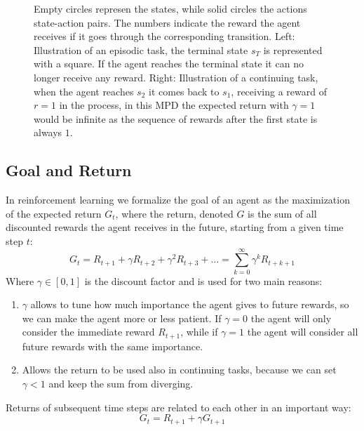 \begin{figure}
    \centering
    
    \caption{Empty circles represen the states, while solid circles the actions state-action pairs. The numbers indicate the reward the agent receives if it goes through the corresponding transition. Left: Illustration of an episodic task, the terminal state $s_T$ is represented with a square. If the agent reaches the terminal state it can no longer receive any reward. Right: Illustration of a continuing task, when the agent reaches $s_2$ it comes back to $s_1$, receiving a reward of $r=1$ in the process, in this MPD the expected return with $\gamma = 1$ would be infinite as the sequence of rewards after the first state is always $1$.}
    \label{fig:episodic-continuing}
\end{figure}

\subsection{Goal and Return}
In reinforcement learning we formalize the goal of an agent as the maximization of the expected return $G_t$, where the return, denoted $G$ is the sum of all discounted rewards the agent receives in the future, starting from a given time step $t$:
\begin{equation}
    G_t = R_{t+1} + \gamma R_{t+2} + \gamma^2 R_{t+3} + \dots = \sum_{k=0}^{\infty} \gamma^k R_{t+k+1}
    \label{return}
\end{equation}
Where $\gamma \in [0, 1]$ is the discount factor and is used for two main reasons:
\begin{enumerate}
    \item $\gamma$ allows to tune how much importance the agent gives to future rewards, so we can make the agent more or less patient. If $\gamma = 0$ the agent will only consider the immediate reward $R_{t+1}$, while if $\gamma = 1$ the agent will consider all future rewards with the same importance.
    \item Allows the return to be used also in continuing tasks, because we can set $\gamma < 1$ and keep the sum from diverging.
\end{enumerate}
Returns of subsequent time steps are related to each other in an important way:
\begin{equation}
    G_t = R_{t+1} + \gamma G_{t+1}
    \label{return-recursive}
\end{equation}

